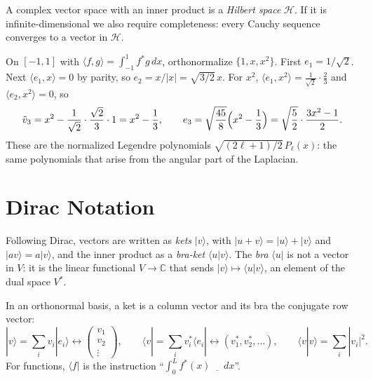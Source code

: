 \begin{definition}
A complex vector space with an inner product is a \emph{Hilbert space} $\mathcal{H}$. If it is infinite-dimensional we also require completeness: every Cauchy sequence converges to a vector in $\mathcal{H}$.
\end{definition}

\begin{example}
On $[-1,1]$ with $\langle f,g\rangle = \int_{-1}^1f^*g\,dx$, orthonormalize $\{1,x,x^2\}$. First $e_1 = 1/\sqrt2$. Next $\langle e_1,x\rangle = 0$ by parity, so $e_2 = x/|x| = \sqrt{3/2}\,x$. For $x^2$, $\langle e_1,x^2\rangle = \frac{1}{\sqrt2}\cdot\frac23$ and $\langle e_2,x^2\rangle = 0$, so
\[
    \tilde{v}_3 = x^2 - \frac{1}{\sqrt2}\cdot\frac{\sqrt2}{3}\cdot1 = x^2 - \frac13,
    \qquad
    e_3 = \sqrt{\frac{45}{8}}\Bigl(x^2-\frac13\Bigr) = \sqrt{\frac52}\cdot\frac{3x^2-1}{2}.
\]
These are the normalized Legendre polynomials $\sqrt{(2\ell+1)/2}\,P_\ell(x)$: the same polynomials that arise from the angular part of the Laplacian.
\end{example}

\section{Dirac Notation}

Following Dirac, vectors are written as \emph{kets} $|v\rangle$, with $|u+v\rangle = |u\rangle+|v\rangle$ and $|av\rangle = a|v\rangle$, and the inner product as a \emph{bra-ket} $\langle u|v\rangle$. The \emph{bra} $\langle u|$ is not a vector in $V$: it is the linear functional $V\to\mathbb{C}$ that sends $|v\rangle\mapsto\langle u|v\rangle$, an element of the dual space $V^*$.

In an orthonormal basis, a ket is a column vector and its bra the conjugate row vector:
\[
    |v\rangle = \sum_iv_i|e_i\rangle\leftrightarrow\begin{pmatrix}v_1\\v_2\\\vdots\end{pmatrix},
    \qquad
    \langle v| = \sum_iv_i^*\langle e_i|\leftrightarrow(v_1^*,v_2^*,\ldots),
    \qquad
    \langle v|v\rangle = \sum_i|v_i|^2 .
\]
For functions, $\langle f|$ is the instruction ``$\int_0^Lf^*(x)\,\underline{\quad}\,dx$''.

